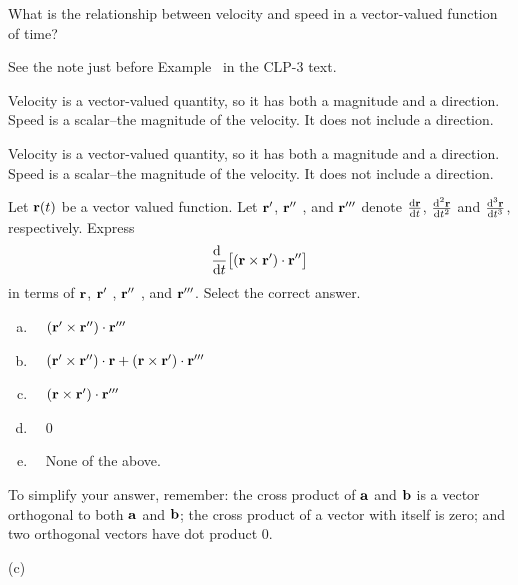 \begin{question}
What is the relationship between velocity and speed in a vector-valued function of time?
\end{question}
\begin{hint} See the note just before Example~
in the CLP-3 text.
\end{hint}
\begin{answer}
Velocity is a vector-valued quantity, so it has both a magnitude and a direction. Speed is a scalar--the magnitude of the velocity. It does not include a direction.
\end{answer}
\begin{solution}
Velocity is a vector-valued quantity, so it has both a magnitude and a direction. Speed is a scalar--the magnitude of the velocity. It does not include a direction.\end{solution}

\begin{question}[M317 2005D] %
Let $\mathbf{r}(t)$ be a vector valued function. Let $\mathbf{r}'$, $\mathbf{r}''$ , and $\mathbf{r}'''$ 
denote $\diff{\vr}{t}$, $\difftwo{\vr}{t}$ and 
$\frac{\mathrm{d^3}\hfil\vr\hfil}{\mathrm{d}{t}^3}$, respectively.
Express
\begin{equation*}
\diff{\hfill}{t}\big[ (\vr \times \vr')\cdot\vr'' \big]
\end{equation*}
in terms of $\mathbf{r}$, $\mathbf{r}'$ , $\mathbf{r}''$ , and $\mathbf{r}'''$. 
Select the correct answer.
\begin{enumerate}[(a)]
\item\ \  $(\mathbf{r}'\times\mathbf{r}'' )\cdot\mathbf{r}'''$
\item\ \  $(\mathbf{r}'\times\mathbf{r}'' )\cdot\mathbf{r} + (\mathbf{r}\times\mathbf{r}' )\cdot\mathbf{r}'''$
\item\ \  $(\mathbf{r}\times\mathbf{r}' )\cdot\mathbf{r}'''$
\item\ \  $0$
\item\ \  None of the above.
\end{enumerate}
\end{question}

\begin{hint} 
To simplify your answer, remember: the cross product of $\mathbf{a}$ and $\mathbf{b}$ is a vector orthogonal to both $\mathbf{a}$ and $\mathbf{b}$; the cross product of a vector with itself is zero; and two orthogonal vectors have dot product 0.
\end{hint}

\begin{answer} 
(c)
\end{answer}

